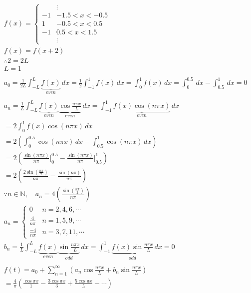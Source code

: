 \documentclass[letterpaper, 12pt]{article}
\begin{document}
\begingroup
\allowdisplaybreaks
\begin{align*}
     & f(x) = \begin{cases}
                     & \vdots          \\
                  -1 & -1.5 < x < -0.5 \\
                  1  & -0.5 < x < 0.5  \\
                  -1 & 0.5 < x < 1.5   \\
                     & \vdots
              \end{cases}
    \\
     & f(x) = f(x + 2)
    \\
     & \therefore 2 = 2L
    \\
     & L = 1
    \\
    \\
     & a_0 = \frac{1}{2L} \int_{-L}^{L} \underbrace{f(x)}_{even} \,dx
    = \frac{1}{2} \int_{-1}^{1} f(x) \,dx
    = \int_{0}^{1} f(x) \,dx = \int_{0}^{0.5} \,dx - \int_{0.5}^{1} \,dx = 0
    \\
    \\
     & a_n = \frac{1}{L} \int_{-L}^{L} \underbrace{f(x)}_{even} \underbrace{\cos \frac{n\pi x}{L}}_{even} \,dx
    = \int_{-1}^{1} \underbrace{f(x) \cos (n\pi x)}_{even} \,dx
    \\
     & = 2\int_{0}^{1} f(x) \cos (n\pi x) \,dx
    \\
     & = 2\left( \int_{0}^{0.5} \cos (n\pi x) \,dx - \int_{0.5}^{1} \cos (n\pi x) \,dx \right)
    \\
     & = 2\left( \frac{\sin (n\pi x)}{n\pi}\Big]_0^{0.5} - \frac{\sin (n\pi x)}{n\pi}\Big]_{0.5}^{1} \right)
    \\
     & = 2\left( \frac{2\sin \left( \frac{n\pi}{2} \right)}{n\pi} - \frac{\sin (n\pi)}{n\pi} \right)
    \\
     & \because n\in \mathbb{N},\quad a_n = 4\left( \frac{\sin (\frac{n\pi}{2})}{n\pi} \right)
    \\
     & a_n = \begin{cases}
                 0               & n = 2, 4, 6, \cdots
                 \\
                 \frac{4}{n\pi}  & n = 1, 5, 9, \cdots
                 \\
                 \frac{-4}{n\pi} & n = 3, 7, 11, \cdots
             \end{cases}
    \\
     & b_n = \frac{1}{L} \int_{-L}^{L} \underbrace{f(x)}_{even} \underbrace{\sin \frac{n\pi x}{L}}_{odd} \,dx
    = \int_{-1}^{1} \underbrace{f(x) \sin \frac{n\pi x}{L}}_{odd} \,dx = 0
    \\
    \\
     & f(t) = a_0 + \sum_{n=1}^{\infty} (a_n \cos \frac{n\pi x}{L} + b_n \sin \frac{n\pi x}{L})
    \\
     & = \frac{4}{\pi}\left( \frac{\cos \pi x}{1} - \frac{3\cos \pi x}{3} + \frac{5\cos \pi x}{5} - \cdots \right)
\end{align*}
\endgroup
\end{document}
